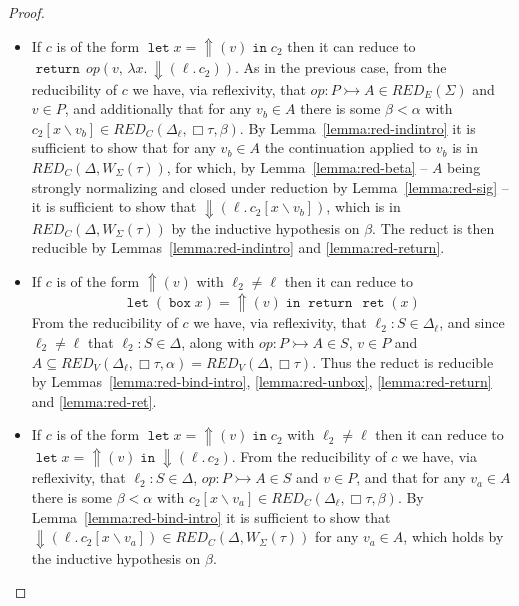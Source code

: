 \documentclass[acmsmall, screen, review, anonymous]{acmart}
\theoremstyle{definition}
\newcommand{\glob}{\mathop{\Box}}
\newcommand{\reflectname}{\mathord{\Uparrow}}
\newcommand{\performraw}[2]{\mathop{\reflectname(#1(#2))}}
\newcommand{\perform}[3]{\performraw{#1}{#2}(#3)}
\newcommand{\reifyname}{\Downarrow}
\newcommand{\reify}[2]{\mathop{\reifyname}(#1.\,#2)}
\newcommand{\loc}{\ell}
\newcommand{\ind}[1]{W_{#1}}
\newcommand{\indintro}[3]{{#1}(#2,\, #3)}
\newcommand{\retname}{\mathtt{ret}}
\newcommand{\ret}[1]{\mathop{\retname}(#1)}
\newcommand{\types}{\mathrel{:}}
\newcommand{\abs}[2]{\lambda#1.\,#2}
\newcommand{\returnname}{\mathop{\mathtt{return}}}
\newcommand{\return}[1]{\returnname\, #1}
\newcommand{\letvname}{\mathop{\mathtt{let}}}
\newcommand{\letv}[3]{\letvname #1 = #2 \mathop{\mathtt{in}} #3}
\newcommand{\gboxname}{\mathop{\mathtt{box}}}
\newcommand{\gbox}[1]{\gboxname #1}
\newcommand{\sub}[2]{[#1\backslash#2]}
\newcommand{\sbst}[3]{#1\sub{#2}{#3}}
\newcommand{\redname}{RED}
\newcommand{\redvname}{\redname_{V}}
\newcommand{\redv}[2]{\redvname{({#1},{#2})}}
\newcommand{\redva}[3]{\redvname{({#1},{#2},{#3})}}
\newcommand{\redcname}{\redname_{C}}
\newcommand{\redc}[2]{\redcname{({#1},{#2})}}
\newcommand{\redca}[3]{\redcname{({#1},{#2},{#3})}}
\newcommand{\redsigname}{\redname_{E}}
\newcommand{\redsig}[1]{\redsigname{(#1)}}
\begin{document}
\begin{proof}
\begin{itemize}
    $\Delta^{\prime} \supseteq \Delta$ and
    $v_b \in \redv{\Delta^{\prime}}{\glob \tau}$ its body with $v_b$
    substituted for $x$ is in $\redc{\Delta^{\prime}}{\ind{\Sigma}(\tau)}$
    by Lemmas~\ref{lemma:red-unbox}, \ref{lemma:red-ret} and
    \ref{lemma:red-return}. Thus for any $v_a \in A$ the continuation
    applied to $v_a$ is in $\redc{\Delta}{\ind{\Sigma}(\tau)}$ by
    Lemma~\ref{lemma:red-app}, and the reduct is reducible by
    Lemmas~\ref{lemma:red-indintro} and \ref{lemma:red-return}.
  \item If $c$ is of the form $\letv{x}{\perform{\loc}{op}{v}}{c_2}$
    then it can reduce to
    $\return{\indintro{op}{v}{\abs{x}{\reify{\loc}{c_2}}}}$. As in the
    previous case, from the reducibility of $c$ we have, via
    reflexivity, that $op \types P \rightarrowtail A \in \redsig{\Sigma}$
    and $v \in P$, and additionally that for any $v_b \in A$ there is
    some $\beta < \alpha$ with $\sbst{c_2}{x}{v_b} \in
    \redca{\Delta_{\loc}}{\glob \tau}{\beta}$. By
    Lemma~\ref{lemma:red-indintro} it is sufficient to show that for
    any $v_b \in A$ the continuation applied to $v_b$ is in
    $\redc{\Delta}{\ind{\Sigma}(\tau)}$, for which, by
    Lemma~\ref{lemma:red-beta} -- $A$ being strongly normalizing and
    closed under reduction by Lemma~\ref{lemma:red-sig} -- it is
    sufficient to show that
    $\reify{\loc}{\sbst{c_2}{x}{v_b}}$, which is in
    $\redc{\Delta}{\ind{\Sigma}(\tau)}$ by the inductive hypothesis on
    $\beta$. The reduct is then reducible by
    Lemmas~\ref{lemma:red-indintro} and \ref{lemma:red-return}.
  \item If $c$ is of the form $\perform{\loc_2}{op}{v}$ with
    $\loc_2 \neq \loc$ then it can reduce to
    \begin{equation*}
      \letv{(\gbox{x})}{\perform{\loc_2}{op}{v}}{\return{\ret{x}}}
    \end{equation*}
    From the reducibility of $c$ we have, via reflexivity, that
    $\loc_2 \types S \in \Delta_{\loc}$, and since $\loc_2 \neq \loc$
    that $\loc_2 \types S \in \Delta$, along with
    $op \types P \rightarrowtail A \in S$, $v \in P$ and
    $A \subseteq \redva{\Delta_{\loc}}{\glob \tau}{\alpha} =
    \redv{\Delta}{\glob \tau}$. Thus the reduct is reducible by
    Lemmas~\ref{lemma:red-bind-intro}, \ref{lemma:red-unbox},
    \ref{lemma:red-return} and \ref{lemma:red-ret}.
  \item If $c$ is of the form $\letv{x}{\perform{\loc_2}{op}{v}}{c_2}$
    with $\loc_2 \neq \loc$ then it can reduce to
    $\letv{x}{\perform{\loc_2}{op}{v}}{\reify{\loc}{c_2}}$. From the
    reducibility of $c$ we have, via reflexivity, that
    $\loc_2 \types S \in \Delta$, $op \types P \rightarrowtail A \in S$
    and $v \in P$, and that for any $v_a \in A$ there is some
    $\beta < \alpha$ with
    $\sbst{c_2}{x}{v_a} \in \redca{\Delta_{\loc}}{\glob
      \tau}{\beta}$. By Lemma~\ref{lemma:red-bind-intro} it is
    sufficient to show that
    $\reify{\loc}{\sbst{c_2}{x}{v_a}} \in
    \redc{\Delta}{\ind{\Sigma}(\tau)}$ for any $v_a \in A$, which holds
    by the inductive hypothesis on $\beta$.
  \end{itemize}
\end{proof}
\end{document}
